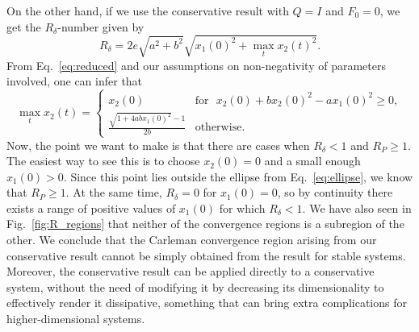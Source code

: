 \documentclass[superscriptaddress,onecolumn,nofootinbib,longbibliography,a4paper,accepted=2026-09-29]{quantumarticle}
\theoremstyle{plain}
\theoremstyle{definition}
\numberwithin{thm}{section}
\numberwithin{assumption}{section}
\numberwithin{lemma}{section}
\numberwithin{prop}{section}
\numberwithin{cor}{section}
\numberwithin{definition}{section}
\numberwithin{rmk}{section}
\numberwithin{equation}{section}
\begin{document}
On the other hand, if we use the conservative result with $Q=I$ and $F_0 =0$, we get the $R_\delta$-number given by
\begin{equation}
    R_\delta =  2e \sqrt{a^2+b^2}  \sqrt{x_1(0)^2+\max_t x_2(t)^2}.
\end{equation}
From Eq.~\eqref{eq:reduced} and our assumptions on non-negativity of parameters involved, one can infer that
\begin{equation}
    \max_t x_2(t) = \left\{\begin{array}{cc}
         x_2(0) & \mathrm{for~~~} x_2(0)+bx_2(0)^2-ax_1(0)^2 \geq 0,\\
         \frac{\sqrt{1+4abx_1(0)^2}-1}{2b}   & \mathrm{otherwise.}
    \end{array}\right.
\end{equation}
Now, the point we want to make is that there are cases when $R_\delta<1$ and $R_P\geq 1$. The easiest way to see this is to choose $x_2(0)=0$ and a small enough $x_1(0)>0$. Since this point lies outside the ellipse from Eq.~\eqref{eq:ellipse}, we know that $R_P\geq 1$. At the same time, $R_\delta=0$ for $x_1(0)=0$, so by continuity there exists a range of positive values of $x_1(0)$ for which $R_\delta<1$. We have also seen in Fig.~\ref{fig:R_regions} that neither of the convergence regions is a subregion of the other. We conclude that the Carleman convergence region arising from our conservative result cannot be simply obtained from the result for stable systems. Moreover, the conservative result can be applied directly to a conservative system, without the need of modifying it by decreasing its dimensionality to effectively render it dissipative, something that can bring extra complications for higher-dimensional systems.
\end{document}
